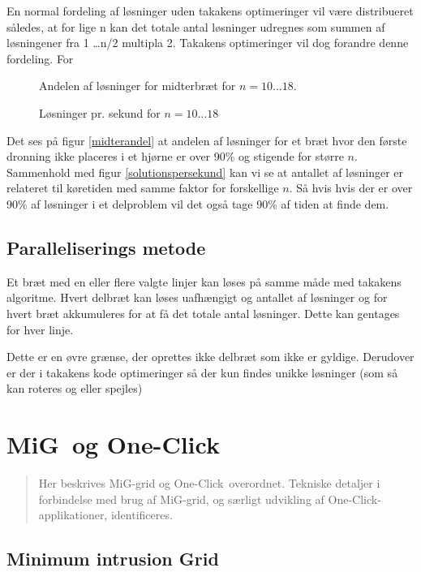 \documentclass[pdf,draft,a4paper,11pt]{article}
\newcommand{\mig}{MiG}
\newcommand{\oc}{One-Click}
\begin{document}
En normal fordeling af løsninger uden takakens optimeringer vil være distribueret således, at for lige n kan det totale antal løsninger udregnes som summen af løsningener fra 1 \ldots n/2 multipla 2. Takakens optimeringer vil dog forandre denne fordeling. For 


\begin{figure}
\caption{Andelen af løsninger for midterbræt for $n=10\ldots18$.}
\label{fig:midterandel}
\end{figure}


\begin{figure}
\caption{Løsninger pr. sekund for $n=10\ldots18$}
\label{fig:solutionspersekund}
\end{figure}

Det ses på figur \ref{midterandel} at andelen af løsninger for et bræt hvor den første dronning ikke placeres i et hjørne er over 90\% og stigende for større $n$. Sammenhold med figur \ref{solutionspersekund} kan vi se at antallet af løsninger er relateret til køretiden med samme faktor for forskellige $n$. Så hvis hvis der er over 90\% af løsninger i et delproblem vil det også tage 90\% af tiden at finde dem. 


\subsection{Paralleliserings metode}\label{parrallel}

Et bræt med en eller flere valgte linjer kan løses på samme måde med takakens algoritme. Hvert delbræt kan løses uafhængigt og antallet af løsninger og for hvert bræt akkumuleres for at få det totale antal løsninger. Dette kan gentages for hver linje. 

Dette er en øvre grænse, der oprettes ikke delbræt som ikke er gyldige. Derudover er der i takakens kode optimeringer så der kun findes unikke løsninger (som så kan roteres og eller spejles) 


\section{\mig\ og \oc}\label{migogoneclick}
\begin{verse}
	Her beskrives \mig-grid og \oc\ overordnet. Tekniske detaljer i forbindelse med brug af \mig-grid, og særligt udvikling af \oc-applikationer, identificeres.  
\end{verse}



\subsection{Minimum intrusion Grid}\label{mig}
\end{document}
